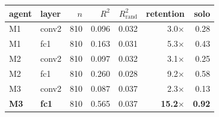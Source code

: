 \begin{tabular}{llrrrrr}
\toprule
agent & layer & $n$ & $R^2$ & $R^2_{\text{rand}}$ & retention & solo \\
\midrule
M1 & conv2 & 810 & 0.096 & 0.032 & 3.0$\times$ & 0.28 \\
M1 & fc1 & 810 & 0.163 & 0.031 & 5.3$\times$ & 0.43 \\
\addlinespace[2pt]
M2 & conv2 & 810 & 0.097 & 0.032 & 3.1$\times$ & 0.25 \\
M2 & fc1 & 810 & 0.260 & 0.028 & 9.2$\times$ & 0.58 \\
\addlinespace[2pt]
M3 & conv2 & 810 & 0.087 & 0.037 & 2.3$\times$ & 0.13 \\
\textbf{M3} & \textbf{fc1} & 810 & 0.565 & 0.037 & \textbf{15.2$\times$} & \textbf{0.92} \\
\bottomrule
\end{tabular}
